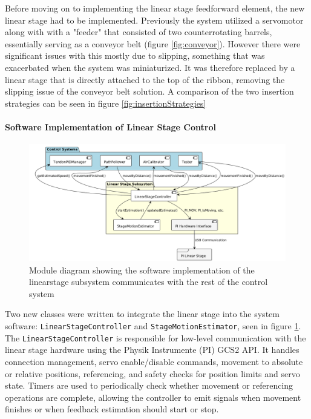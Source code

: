 Before moving on to implementing the linear stage feedforward element, the new linear stage had to be implemented. Previously the system utilized a servomotor along with with a "feeder" that consisted of two counterrotating barrels, essentially serving as a conveyor belt (figure \ref{fig:conveyor}). However there were significant issues with this mostly due to slipping, something that was exacerbated when the system was miniaturized. It was therefore replaced by a linear stage that is directly attached to the top of the ribbon, removing the slipping issue of the conveyor belt solution. A comparison of the two insertion strategies can be seen in figure \ref{fig:insertionStrategies}

\paragraph*{Software Implementation of Linear Stage Control}
\begin{figure}[H]
    \centering
    \includegraphics[width=\linewidth]{images/Software documentation/linearstage.png}
    \caption{Module diagram showing the software implementation of the linearstage subsystem communicates with the rest of the control system}
    \label{fig:linearsoftware}
\end{figure}
Two new classes were written to integrate the linear stage into the system software: 
\texttt{LinearStageController} and \texttt{StageMotionEstimator}, seen in figure \ref{fig:linearsoftware}. The \newline \texttt{LinearStageController} is responsible for low-level communication with the linear stage hardware using the Physik Instrumente (PI) GCS2 API. It handles connection management, servo enable/disable commands, movement to absolute or relative positions, referencing, and safety checks for position limits and servo state. Timers are used to periodically check whether movement or referencing operations are complete, allowing the controller to emit signals when movement finishes or when feedback estimation should start or stop.


